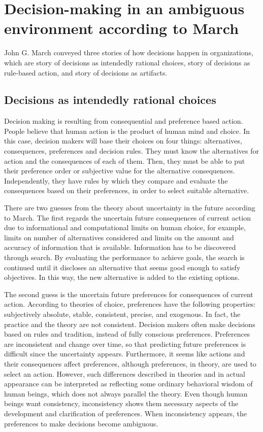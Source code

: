 \section{Decision-making in an ambiguous environment according to March}

John G. March conveyed three stories of how decisions happen in organizations, which are story of decisions as intendedly rational choices, story of decisions as rule-based action, and story of decisions as artifacts\cite{2}.

\subsection{Decisions as intendedly rational choices}

Decision making is resulting from consequential and preference based action. People believe that human action is the product of human mind and choice\cite{6}. In this case, decision makers will base their choices on four things: alternatives, consequences, preferences and decision rules. They must know the alternatives for action and the consequences of each of them. Then, they must be able to put their preference order or subjective value for the alternative consequences. Independently, they have rules by which they compare and evaluate the consequences based on their preferences, in order to select suitable alternative.

There are two guesses from the theory about uncertainty in the future according to March\cite{2}. The first regards the uncertain future consequences of current action due to informational and computational limits on human choice, for example, limits on number of alternatives considered and limits on the amount and accuracy of information that is available. Information has to be discovered through search. By evaluating the performance to achieve goals, the search is continued until it discloses an alternative that seems good enough to satisfy objectives. In this way, the new alternative is added to the existing options.

The second guess is the uncertain future preferences for consequences of current action. According to theories of choice\cite{2}, preferences have the following properties: subjectively absolute, stable, consistent, precise, and exogenous. In fact, the practice and the theory are not consistent. Decision makers often make decisions based on rules and tradition, instead of fully conscious preferences. Preferences are inconsistent and change over time, so that predicting future preferences is difficult since the uncertainty appears. Furthermore, it seems like actions and their consequences affect preferences, although preferences, in theory, are used to select an action. However, such differences described in theories and in actual appearance can be interpreted as reflecting some ordinary behavioral wisdom of human beings, which does not always parallel the theory. Even though human beings want consistency, inconsistency shows them necessary aspects of the development and clarification of preferences. When inconsistency appears, the preferences to make decisions become ambiguous\cite{6}.

